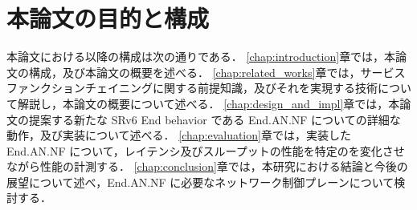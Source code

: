 \section{本論文の目的と構成}
本論文における以降の構成は次の通りである．
\ref*{chap:introduction}章では，本論文の構成，及び本論文の概要を述べる．
\ref*{chap:related_works}章では，サービスファンクションチェイニングに関する前提知識，及びそれを実現する技術について解説し，本論文の概要について述べる．
\ref*{chap:design_and_impl}章では，本論文の提案する新たな SRv6 End behavior である End.AN.NF についての詳細な動作，及び実装について述べる．
\ref*{chap:evaluation}章では，実装した End.AN.NF について，レイテンシ及びスループットの性能を特定のを変化させながら性能の計測する．
\ref*{chap:conclusion}章では，本研究における結論と今後の展望について述べ，End.AN.NF に必要なネットワーク制御プレーンについて検討する．